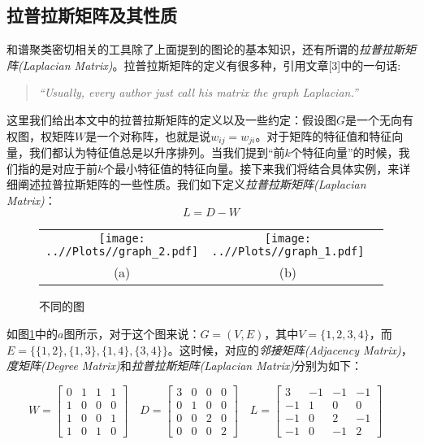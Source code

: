 \documentclass[UTF8, 12pt]{ctexart}
\begin{document}
\subsection{拉普拉斯矩阵及其性质}
和谱聚类密切相关的工具除了上面提到的图论的基本知识，还有所谓的\emph{拉普拉斯矩阵(Laplacian Matrix)}。拉普拉斯矩阵的定义有很多种，引用文章[3]中的一句话:
\begin{quote}
	\emph{“Usually, every author just call his matrix the graph Laplacian.”}
\end{quote}

这里我们给出本文中的拉普拉斯矩阵的定义以及一些约定：假设图$G$是一个无向有权图，权矩阵$W$是一个对称阵，也就是说${w_{ij}}={w_{ji}}$。对于矩阵的特征值和特征向量，我们都认为特征值总是以升序排列。当我们提到“前$k$个特征向量”的时候，我们指的是对应于前$k$个最小特征值的特征向量。接下来我们将结合具体实例，来详细阐述拉普拉斯矩阵的一些性质。我们如下定义\emph{拉普拉斯矩阵(Laplacian Matrix)}：
\begin{equation}
	L = D - W
\end{equation}

\begin{figure}[H]
	\centering
	\begin{tabular}{ccc}
		\texttt{[image: ..//Plots//graph\_2.pdf]}  & 
		\texttt{[image: ..//Plots//graph\_1.pdf]}  \\ 
		(a) & (b)\\
	\end{tabular}
	\caption{不同的图}
	\label{Fig:1}
	\vspace{-0.5em}
\end{figure}

如图\ref{Fig:1}中的$a$图所示，对于这个图来说：$G=(V,E)$，其中$V=\{1,2,3,4\}$，而$E=\{\{1,2\},\{1,3\},\{1,4\},\{3,4\}\}$。这时候，对应的\emph{邻接矩阵(Adjacency Matrix)}，\emph{度矩阵(Degree Matrix)}和\emph{拉普拉斯矩阵(Laplacian Matrix)}分别为如下：

\begin{equation}
W = \begin{bmatrix}
0 & 1 & 1 & 1 \\
1 & 0 & 0 & 0 \\
1 & 0 & 0 & 1 \\
1 & 0 & 1 & 0
\end{bmatrix}\quad
D = \begin{bmatrix}
3 & 0 & 0 & 0 \\
0 & 1 & 0 & 0 \\
0 & 0 & 2 & 0 \\
0 & 0 & 0 & 2
\end{bmatrix} \quad
L = \begin{bmatrix}
3 & -1 & -1 & -1 \\
-1 & 1 & 0 & 0 \\
-1 & 0 & 2 & -1 \\
-1 & 0 & -1 & 2
\end{bmatrix} \quad
\end{equation}
\end{document}
